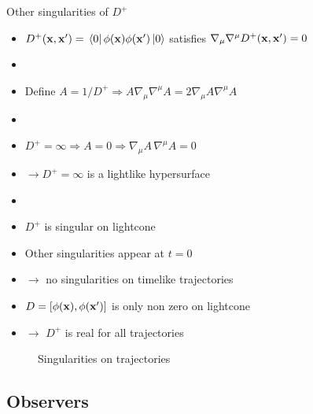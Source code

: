 \documentclass{beamer}
\begin{document}
\begin{frame}{Other singularities of \(D^+\)}
\begin{itemize}
	\item \(D^+(\vb{x},\vb{x}') = \bra*{0}\phi(\vb{x})\phi(\vb{x}')\ket*{0}\) satisfies \(\nabla_\mu\nabla^\mu D^+(\vb{x},\vb{x}') = 0\)
	\item[]
	\item Define \(A = 1/D^+ \Rightarrow A \nabla_\mu\nabla^\mu A = 2 \nabla_\mu A \nabla^\mu A\)
	\item[]	
	\item \(D^+ = \infty \Rightarrow A = 0 \Rightarrow \nabla_\mu A\,\nabla^\mu A = 0\)
	\item[] \(\to D^+ = \infty\) is a lightlike hypersurface
	\item[]	
	\item \(D^+\) is singular on lightcone
\end{itemize}
\end{frame}
\begin{frame}
\begin{itemize}
	\item Other singularities appear at \(t = 0\) 
	\item[] \(\to\) no singularities on timelike trajectories 
	\item \(D = [\phi(\vb{x}),\phi(\vb{x}')]\) is only non zero on lightcone
	\item[] \(\to\) \(D^+\) is real for all trajectories 
\end{itemize}
\begin{figure}
\centering
{}
\caption{Singularities on trajectories}
\end{figure}
\end{frame}

\subsection{Observers}
\end{document}
